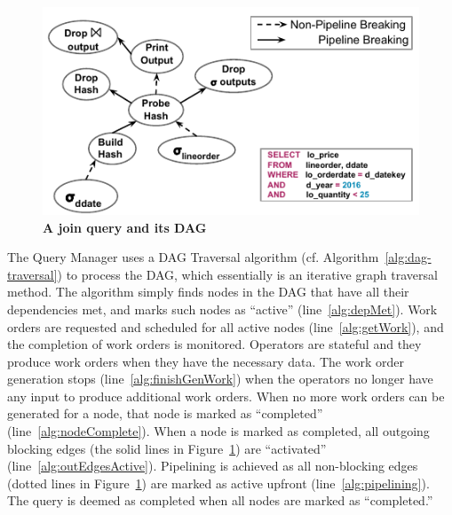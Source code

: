 \begin{figure}[]
	\centering
	\includegraphics[width=\columnwidth]{policy/figures/QueryPlan.pdf}
	\caption{\textbf{A join query and its DAG}}
	\label{fig:dag}
\end{figure}

The Query Manager uses a DAG Traversal algorithm (cf. Algorithm~\ref{alg:dag-traversal}) to process the DAG, which essentially is an iterative graph traversal method. 
The algorithm simply finds nodes in the DAG that have all their dependencies met, and marks such nodes as ``active'' (line~\ref{alg:depMet}).
Work orders are requested and scheduled for all active nodes (line~\ref{alg:getWork}), and 
the completion of work orders is monitored. 
Operators are stateful and they produce work orders when they have the necessary data.
The work order generation stops (line~\ref{alg:finishGenWork}) when the operators no longer have any input to produce additional work orders.
When no more work orders can be generated for a node, that node is marked as 
``completed'' (line~\ref{alg:nodeComplete}). 
When a node is marked as completed, all outgoing blocking edges (the solid lines 
in Figure~\ref{fig:dag}) are ``activated'' (line~\ref{alg:outEdgesActive}). 
Pipelining is achieved as all non-blocking edges (dotted lines in 
Figure~\ref{fig:dag}) are marked as active upfront (line~\ref{alg:pipelining}).
The query is deemed as completed when all nodes are marked as ``completed.''

